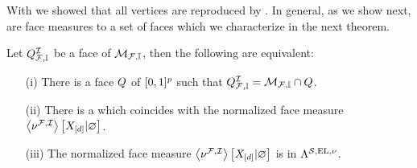 
With  we showed that all vertices are reproduced by \HardLogicNetworks{}.
In general, as we show next, \HardLogicNetworks{} are face measures to a set of faces which we characterize in the next theorem.

\begin{theorem}
    \label{the:faceMeasureHardLogicNetworks}
    Let $Q^{\mathcal{I}}_{\mathcal{F},\mathbb{I}}$ be a face of $\mathcal{M}_{\mathcal{F},\mathbb{I}}$, then the following are equivalent:
    \begin{itemize}
        \item[(i)] There is a face $Q$ of $[0,1]^{p}$ such that $Q^{\mathcal{I}}_{\mathcal{F},\mathbb{I}}=\mathcal{M}_{\mathcal{F},\mathbb{I}}\cap Q$.
        \item[(ii)] There is a \HardLogicNetwork{} which coincides with the normalized face measure $\left\langle \nu^{\mathcal{F},\mathcal{I}}\right\rangle \left[ X_{[d]} | \varnothing \right]$.
        \item[(iii)] The normalized face measure $\left\langle \nu^{\mathcal{F},\mathcal{I}}\right\rangle \left[ X_{[d]} | \varnothing \right]$ is in $\Lambda^{\mathcal{S},\mathrm{EL},\nu}$.
    \end{itemize}
\end{theorem}
